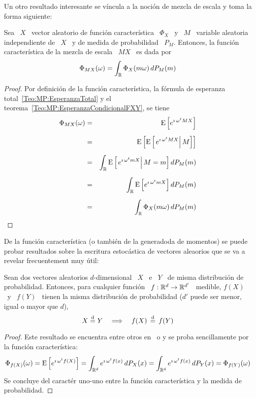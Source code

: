 {Un otro resultado  interesante se v\'incula a la noci\'on de  mezcla de escala y
toma la forma siguiente:
%
\begin{teorema}
  Sea \  $X$ \ vector aleatorio de  funci\'on caracter\'istica \ $\Phi_X$  \ y \
  $M$ \ variable aleatoria independiente de  \ $X$ \ y de medida de probabilidad
  \ $P_M$.  Entonces, la funci\'on caracter\'istica  de la mezcla de escala \ $M
  X$ \ es dada por
  \[
  \Phi_{M X}(\omega) = \int_{\mathbb{R}} \Phi_X(m \omega) \, dP_M(m)
  \]
\end{teorema}
%
\begin{proof}
  Por definici\'on  de la funci\'on caracter\'istica, la  f\'ormula de esperanza
  total~\ref{Teo:MP:EsperanzaTotal}                     y                     el
  teorema~\ref{Teo:MP:EsperanzaCondicionalFXY}, se tiene
  \begin{eqnarray*}
  \Phi_{M X}(\omega) & = & \operatorname{E}\left[ e^{\imath \, \omega^t M X} \right]\\[2mm]
  & = & \operatorname{E}\left[ \operatorname{E}\left[ \left. e^{\imath \, \omega^t M X} \right| M \right] \right]\\[2mm]
  & = & \int_{\mathbb{R}} \operatorname{E}\left[ \left. e^{\imath \, \omega^t m X} \right| M=m \right] dP_M(m)\\[2mm]
  & = & \int_{\mathbb{R}} \operatorname{E}\left[ e^{\imath \, \omega^t m X} \right] dP_M(m)\\[2mm]
  & = & \int_{\mathbb{R}} \Phi_X(m \omega) \, dP_M(m)
  \end{eqnarray*}
\end{proof}
 
De la funci\'on  caracter\'istica (o tambi\'en de la  generadoda de momentos) se
puede probar  resultados sobre la escritura estoc\'astica  de vectores aleaorios
que se va a revelar frecuentement muy \'util:
%
\begin{teorema}\label{Teo:MP:IgualdadDistribucionFuncionVA}
  Sean  dos vectores  aleatorios $d$-dimensional  \ $X$  \ e  \ $Y$  \  de misma
  distribuci\'on  de  probabilidad. Entonces,  para  cualquier  funci\'on \  $f:
  \mathbb{R}^d  \to \mathbb{R}^{d'}$ \  medible, $f(X)$  \ y  \ $f(Y)$  \ tienen  la misma
  distribuci\'on de probabilidad ($d'$ puede  ser menor, igual o mayor que $d$),
  \ie
  \[
  X  \stackrel{\mathrm{d}}{=}  Y \quad  \Longrightarrow  \quad  f(X) \, \stackrel{\mathrm{d}}{=} \, f(Y)
  \]
\end{teorema}
%
\begin{proof}
  Este resultado se encuentra entre otros en~\cite[aserci\'on~2~p.~13]{FanKot90}
  o \cite{Zol86} y se proba sencillamente por la funci\'on caracter\'istica:
  \[
  \Phi_{f(X)}(\omega)  =  \operatorname{E}\left[  e^{\imath  \,  \omega^t  f(X)}  \right]  =
  \int_{\mathbb{R}^d}  e^{\imath  \,  \omega^t  f(x)}  \,  dP_X(x)  =  \int_{\mathbb{R}^d}
  e^{\imath \, \omega^t f(x)} \, dP_Y(x) = \Phi_{f(Y)}(\omega)
  \]
  Se concluye  del caract\'er uno-uno  entre la funci\'on caracter\'istica  y la
  medida de probabilidad.
\end{proof} 
}

